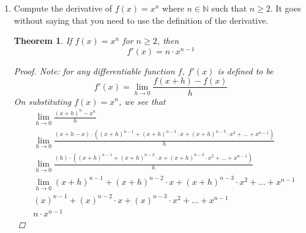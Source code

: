 \documentclass{amsart}
\newtheorem{theorem}{Theorem}
\begin{document}
\begin{enumerate}[1.]
    
    \newpage
    \item Compute the derivative of $f(x) = x^n$ where $n \in \mathbb{N}$ such that $n \geq 2$. It goes without saying that you need to use the definition of the derivative.
    \begin{theorem}
        If $f(x) = x^n$ for $n \geq 2$, then
        \[
            f'(x) = n\cdot x^{n -1}    
        \]
        \begin{proof}
            Note: for any differentiable function $f$, $f'(x)$ is defined to be 
            \[
                f'(x) = \lim_{h \to 0} \frac{f(x + h) - f(x)}{h}    
            \]
            On substituting $f(x) = x^n$, we see that
            \begin{align*}
                &\lim_{h \to 0} \frac{(x + h)^n - x^n}{h} \\
                &\lim_{h \to 0} \frac{(x+h - x)\cdot((x+h)^{n-1} + (x+h)^{n-2}\cdot x + (x+h)^{n-3}\cdot x^2 + ... + x^{n -1})}{h} \\
                &\lim_{h \to 0} \frac{(h)\cdot((x+h)^{n-1} + (x+h)^{n-2}\cdot x + (x+h)^{n-3}\cdot x^2 + ... + x^{n -1})}{h} \\
                &\lim_{h \to 0} (x+h)^{n-1} + (x+h)^{n-2}\cdot x + (x+h)^{n-3}\cdot x^2 + ... + x^{n -1} \\
                &(x)^{n-1} + (x)^{n-2}\cdot x + (x)^{n-3}\cdot x^2 + ... + x^{n -1} \\
                &n\cdot x^{n-1}
            \end{align*}
        \end{proof}
    \end{theorem}
 

\end{enumerate}
\end{document}
